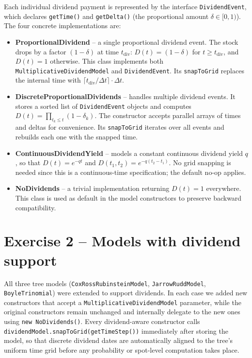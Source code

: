 \documentclass[11pt,a4paper]{article}
\begin{document}
Each individual dividend payment is represented by the interface \texttt{DividendEvent}, which declares \texttt{getTime()} and \texttt{getDelta()} (the proportional amount $\delta \in [0,1)$). The four concrete implementations are:
\begin{itemize}[nosep]
  \item \textbf{ProportionalDividend} -- a single proportional dividend event. The stock drops by a factor $(1-\delta)$ at time $t_{\text{div}}$: $D(t) = (1-\delta)$ for $t \geq t_{\text{div}}$, and $D(t) = 1$ otherwise. This class implements both \texttt{MultiplicativeDividendModel} and \texttt{DividendEvent}.  Its \texttt{snapToGrid} replaces the internal time with $\lceil t_{\text{div}}/\Delta t\rceil \cdot \Delta t$.
  \item \textbf{DiscreteProportionalDividends} -- handles multiple dividend events. It stores a sorted list of \texttt{DividendEvent} objects and computes $D(t) = \prod_{t_k \leq t}(1-\delta_k)$. The constructor accepts parallel arrays of times and deltas for convenience. Its \texttt{snapToGrid} iterates over all events and rebuilds each one with the snapped time.
  \item \textbf{ContinuousDividendYield} -- models a constant continuous dividend yield $q$, so that $D(t) = e^{-qt}$ and $D(t_1,t_2) = e^{-q(t_2-t_1)}$. No grid snapping is needed since this is a continuous-time specification; the default no-op applies.
  \item \textbf{NoDividends} -- a trivial implementation returning $D(t)=1$ everywhere. This class is used as default in the model constructors to preserve backward compatibility.
\end{itemize}

\section{Exercise 2 -- Models with dividend support}

All three tree models (\texttt{CoxRossRubinsteinModel}, \texttt{JarrowRuddModel}, \texttt{BoyleTrinomial}) were extended to support dividends. In each case we added new constructors that accept a \texttt{MultiplicativeDividendModel} parameter, while the original constructors remain unchanged and internally delegate to the new ones using \texttt{new NoDividends()}.  Every dividend-aware constructor calls \texttt{dividendModel.snapToGrid(getTimeStep())} immediately after storing the model, so that discrete dividend dates are automatically aligned to the tree's uniform time grid before any probability or spot-level computation takes place.
\end{document}
